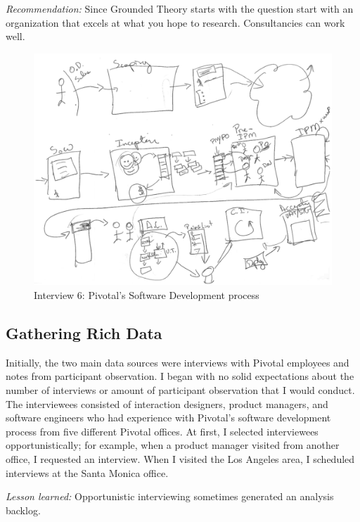 \textit{Recommendation:} Since Grounded Theory starts with the question  start with an organization that excels at what you hope to research. Consultancies can work well. %

\begin{figure}[tbp]
\centering
\includegraphics[width=\oneColumnWidth{}]{drawings/2015_08_12_anchor.png}
\caption{Interview 6:  Pivotal's Software Development process}
\label{2015_08_12_detailed}
\end{figure}
\subsection{Gathering Rich Data}
Initially, the two main data sources were interviews with Pivotal employees and notes from participant observation. I began with no solid expectations about the number of interviews or amount of participant observation that I would conduct. The interviewees consisted of interaction designers, product managers, and software engineers who had experience with Pivotal's software development process from five different Pivotal offices. At first, I selected interviewees opportunistically; for example, when a product manager visited from another office, I requested an interview. When I visited the Los Angeles area, I scheduled interviews at the Santa Monica office. 

\textit{Lesson learned:} Opportunistic interviewing sometimes generated an analysis backlog. 


